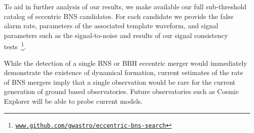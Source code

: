 To aid in further analysis of our results, we make available our full sub-threshold catalog of eccentric BNS candidates. For each candidate we provide the false alarm rate, parameters of the associated template waveform, and signal parameters such as the signal-to-noise and results of our signal consistency tests~\cite{1-ECCBNS}\footnote{\texttt{\url{www.github.com/gwastro/eccentric-bns-search}}}.

While the detection of a single BNS or BBH eccentric merger would immediately demonstrate the existence of dynamical formation, current estimates of the rate of BNS mergers imply that a single observation would be rare for the current generation of ground based observatories. Future observatories such as Cosmic Explorer will be able to probe current models.

\label{sec:disc}
